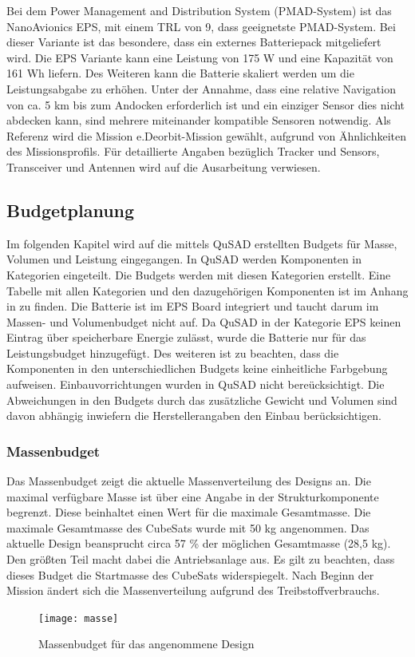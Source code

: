 	Bei dem Power Management and Distribution System (PMAD-System) ist das NanoAvionics EPS, mit einem TRL von 9, dass geeignetste PMAD-System. Bei dieser Variante ist das besondere, dass ein externes Batteriepack mitgeliefert wird. Die EPS Variante kann eine Leistung von 175 W und eine Kapazität von 161 Wh liefern. Des Weiteren kann die Batterie skaliert werden um die Leistungsabgabe zu erhöhen. Unter der Annahme, dass eine relative Navigation von ca. 5 km bis zum Andocken erforderlich ist und ein einziger Sensor dies nicht abdecken kann, sind mehrere miteinander kompatible Sensoren notwendig. Als Referenz wird die Mission e.Deorbit-Mission gewählt, aufgrund von Ähnlichkeiten des Missionsprofils. Für detaillierte Angaben bezüglich Tracker und Sensors, Transceiver und Antennen wird auf die Ausarbeitung \cite{Lettau.} verwiesen.

				\subsection{Budgetplanung}
Im folgenden Kapitel wird auf die mittels QuSAD erstellten Budgets für Masse, Volumen und Leistung eingegangen. In QuSAD werden Komponenten in Kategorien eingeteilt. Die Budgets werden mit diesen Kategorien erstellt. Eine Tabelle mit allen Kategorien und den dazugehörigen Komponenten ist im Anhang in \tab{} zu finden. Die Batterie ist im EPS Board integriert und taucht darum im Massen- und Volumenbudget nicht auf. Da QuSAD in der Kategorie EPS keinen Eintrag über speicherbare Energie zulässt, wurde die Batterie nur für das Leistungsbudget hinzugefügt. Des weiteren ist zu beachten, dass die Komponenten in den unterschiedlichen Budgets keine einheitliche Farbgebung aufweisen. Einbauvorrichtungen wurden in QuSAD nicht bereücksichtigt. Die Abweichungen in den Budgets durch das  zusätzliche Gewicht und Volumen sind davon abhängig inwiefern die Herstellerangaben den Einbau berücksichtigen.\\

						\subsubsection{Massenbudget}
Das Massenbudget  zeigt die aktuelle Massenverteilung des Designs an. Die maximal verfügbare Masse ist über eine Angabe in der Strukturkomponente begrenzt. Diese beinhaltet einen Wert für die maximale Gesamtmasse. Die maximale Gesamtmasse des CubeSats wurde mit 50 kg angenommen. Das aktuelle Design beansprucht circa 57 \% der möglichen Gesamtmasse (28,5 kg). Den größten Teil macht dabei die Antriebsanlage aus. Es gilt zu beachten, dass dieses Budget die Startmasse des CubeSats widerspiegelt. Nach Beginn der Mission ändert sich die Massenverteilung aufgrund des Treibstoffverbrauchs.\\
										\begin{figure}[!h]
											\centering
												\texttt{[image: masse]}
											\caption{Massenbudget für das angenommene Design}
											\label{fig:masse}
										\end{figure}
								
